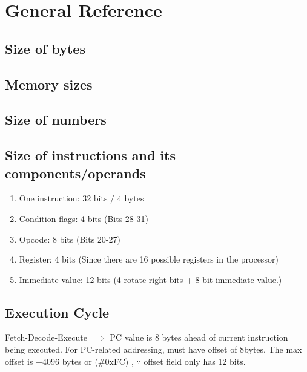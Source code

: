 \documentclass[../comorg-part1.tex]{subfiles}
\begin{document}
\section{General Reference}
\subsection{Size of bytes}

\subsection{Memory sizes}

\subsection{Size of numbers}


\subsection{Size of instructions and its components/operands}
\begin{enumerate}
    \item One instruction: 32 bits / 4 bytes
    \item Condition flags: 4 bits (Bits 28-31)
    \item Opcode: 8 bits (Bits 20-27)
    \item Register: 4 bits (Since there are 16 possible registers in the processor)
    \item Immediate value: 12 bits (4 rotate right bits + 8 bit immediate value.)
\end{enumerate}

\subsection{Execution Cycle}
Fetch-Decode-Execute $\implies$ PC value is 8 bytes ahead of current instruction being executed.
For PC-related addressing, must have offset of 8bytes.
The max offset is $\pm 4096$ bytes or (\#0xFC) , $\because$ offset field only has 12 bits.
\end{document}
